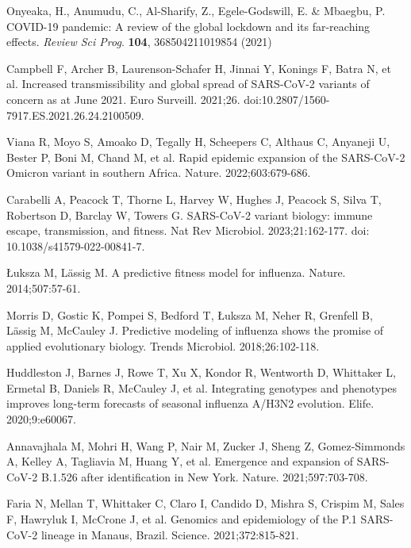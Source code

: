\documentclass[10pt,letterpaper]{article}
\begin{document}
\begin{thebibliography}{10}

Onyeaka, H., Anumudu, C., Al-Sharify, Z., Egele-Godswill, E. \& Mbaegbu, P. COVID-19 pandemic: A review of the global lockdown and its far-reaching effects. {\em Review Sci Prog}. \textbf{104}, 368504211019854 (2021)

 Campbell F, Archer B, Laurenson-Schafer H, Jinnai Y, Konings F, Batra N, et al. Increased transmissibility and global spread of SARS-CoV-2 variants of concern as at June 2021. Euro Surveill. 2021;26. doi:10.2807/1560-7917.ES.2021.26.24.2100509.

 Viana R, Moyo S, Amoako D, Tegally H, Scheepers C, Althaus C, Anyaneji U, Bester P, Boni M, Chand M, et al. Rapid epidemic expansion of the SARS-CoV-2 Omicron variant in southern Africa. Nature. 2022;603:679-686.

 Carabelli A, Peacock T, Thorne L, Harvey W, Hughes J, Peacock S, Silva T, Robertson D, Barclay W, Towers G. SARS-CoV-2 variant biology: immune escape, transmission, and fitness. Nat Rev Microbiol. 2023;21:162-177. doi: 10.1038/s41579-022-00841-7.

 Łuksza M, Lässig M. A predictive fitness model for influenza. Nature. 2014;507:57-61.

 Morris D, Gostic K, Pompei S, Bedford T, Łuksza M, Neher R, Grenfell B, Lässig M, McCauley J. Predictive modeling of influenza shows the promise of applied evolutionary biology. Trends Microbiol. 2018;26:102-118.

 Huddleston J, Barnes J, Rowe T, Xu X, Kondor R, Wentworth D, Whittaker L, Ermetal B, Daniels R, McCauley J, et al. Integrating genotypes and phenotypes improves long-term forecasts of seasonal influenza A/H3N2 evolution. Elife. 2020;9:e60067.

 Annavajhala M, Mohri H, Wang P, Nair M, Zucker J, Sheng Z, Gomez-Simmonds A, Kelley A, Tagliavia M, Huang Y, et al. Emergence and expansion of SARS-CoV-2 B.1.526 after identification in New York. Nature. 2021;597:703-708.

 Faria N, Mellan T, Whittaker C, Claro I, Candido D, Mishra S, Crispim M, Sales F, Hawryluk I, McCrone J, et al. Genomics and epidemiology of the P.1 SARS-CoV-2 lineage in Manaus, Brazil. Science. 2021;372:815-821.


\end{thebibliography}
\end{document}
